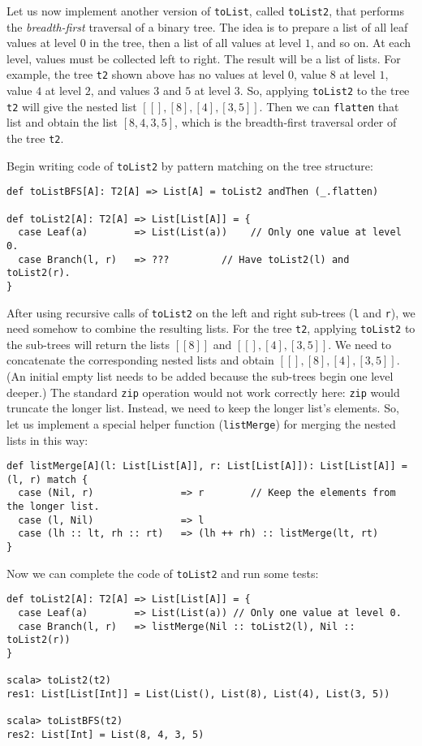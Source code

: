Let us now implement another version of \lstinline!toList!, called
\lstinline!toList2!, that performs the \emph{breadth-first} traversal
of a binary tree. The idea is to prepare a list of all leaf values
at level $0$ in the tree, then a list of all values at level $1$,
and so on. At each level, values must be collected left to right.
The result will be a list of lists. For example, the tree \lstinline!t2!
shown above has no values at level $0$, value $8$ at level $1$,
value $4$ at level $2$, and values $3$ and $5$ at level $3$.
So, applying \lstinline!toList2! to the tree \lstinline!t2! will
give the nested list $\left[\left[\right],\left[8\right],\left[4\right],\left[3,5\right]\right]$.
Then we can \lstinline!flatten! that list and obtain the list $\left[8,4,3,5\right]$,
which is the breadth-first traversal order of the tree \lstinline!t2!. 

Begin writing code of \lstinline!toList2! by pattern matching on
the tree structure:
\begin{lstlisting}
def toListBFS[A]: T2[A] => List[A] = toList2 andThen (_.flatten)

def toList2[A]: T2[A] => List[List[A]] = {
  case Leaf(a)        => List(List(a))    // Only one value at level 0.
  case Branch(l, r)   => ???         // Have toList2(l) and toList2(r).
}
\end{lstlisting}
After using recursive calls of \lstinline!toList2! on the left and
right sub-trees (\lstinline!l! and \lstinline!r!), we need somehow
to combine the resulting lists. For the tree \lstinline!t2!, applying
\lstinline!toList2! to the sub-trees will return the lists $\left[\left[8\right]\right]$
and $\left[\left[\right],\left[4\right],\left[3,5\right]\right]$.
We need to concatenate the corresponding nested lists and obtain $\left[\left[\right],\left[8\right],\left[4\right],\left[3,5\right]\right]$.
(An initial empty list needs to be added because the sub-trees begin
one level deeper.) The standard \lstinline!zip! operation would not
work correctly here: \lstinline!zip! would truncate the longer list.
Instead, we need to keep the longer list\textsf{'}s elements. So, let us implement
a special helper function (\lstinline!listMerge!) for merging the
nested lists in this way:
\begin{lstlisting}
def listMerge[A](l: List[List[A]], r: List[List[A]]): List[List[A]] = (l, r) match {
  case (Nil, r)               => r        // Keep the elements from the longer list.
  case (l, Nil)               => l
  case (lh :: lt, rh :: rt)   => (lh ++ rh) :: listMerge(lt, rt)
}
\end{lstlisting}
Now we can complete the code of \lstinline!toList2! and run some
tests:
\begin{lstlisting}
def toList2[A]: T2[A] => List[List[A]] = {
  case Leaf(a)        => List(List(a)) // Only one value at level 0.
  case Branch(l, r)   => listMerge(Nil :: toList2(l), Nil :: toList2(r))
}

scala> toList2(t2)
res1: List[List[Int]] = List(List(), List(8), List(4), List(3, 5))

scala> toListBFS(t2)
res2: List[Int] = List(8, 4, 3, 5)
\end{lstlisting}

